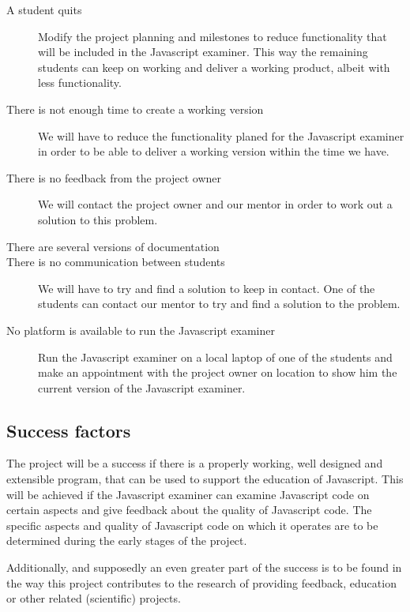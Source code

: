 \documentclass{article}
\begin{document}
\begin{description}
  \item[A student quits] Modify the project planning and milestones to reduce
    functionality that will be included in the Javascript examiner. This way
    the remaining students can keep on working and deliver a working product,
    albeit with less functionality.
  \item[There is not enough time to create a working version] We will have to
    reduce the functionality planed for the Javascript examiner in order to be
    able to deliver a working version within the time we have.
  \item[There is no feedback from the project owner] We will contact the
    project owner and our mentor in order to work out a solution to this
    problem.
  \item[There are several versions of documentation]
  \item[There is no communication between students] We will have to try and
    find a solution to keep in contact. One of the students can contact our
    mentor to try and find a solution to the problem.
  \item[No platform is available to run the Javascript examiner] Run the
    Javascript examiner on a local laptop of one of the students and make an
    appointment with the project owner on location to show him the current
    version of the Javascript examiner.
\end{description}

\subsection{Success factors}

The project will be a success if there is a properly working, well designed and
extensible program, that can be used to support the education of
Javascript. This will be achieved if the Javascript examiner can examine
Javascript code on certain aspects and give feedback about the quality of
Javascript code. The specific aspects and quality of Javascript code on which
it operates are to be determined during the early stages of the project.

Additionally, and supposedly an even greater part of the success is to be found
in the way this project contributes to the research of providing feedback,
education or other related (scientific) projects.
\end{document}
